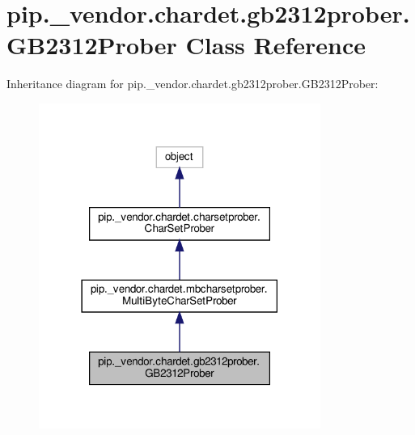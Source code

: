 \hypertarget{classpip_1_1__vendor_1_1chardet_1_1gb2312prober_1_1GB2312Prober}{}\section{pip.\+\_\+vendor.\+chardet.\+gb2312prober.\+G\+B2312\+Prober Class Reference}
\label{classpip_1_1__vendor_1_1chardet_1_1gb2312prober_1_1GB2312Prober}


Inheritance diagram for pip.\+\_\+vendor.\+chardet.\+gb2312prober.\+G\+B2312\+Prober\+:
\nopagebreak
\begin{figure}[H]
\begin{center}
\leavevmode
\includegraphics[width=261pt]{classpip_1_1__vendor_1_1chardet_1_1gb2312prober_1_1GB2312Prober__inherit__graph}
\end{center}
\end{figure}


